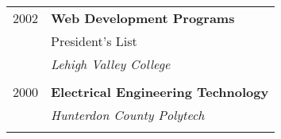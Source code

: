 \documentclass[11pt]{article} %
\begin{document}
\begin{minipage}[t]{0.44\textwidth}
\begin{tabular}{rl}
	 

2002 & \textbf{Web Development Programs} \\ 
& \small President's List \\
& \textit{Lehigh Valley College}\\
&\\
	 

2000 & \textbf{Electrical Engineering Technology}\\
& \textit{Hunterdon County Polytech}\\
&\\
	 



\end{tabular}\\[10pt]	
\end{minipage} %
\end{document}
